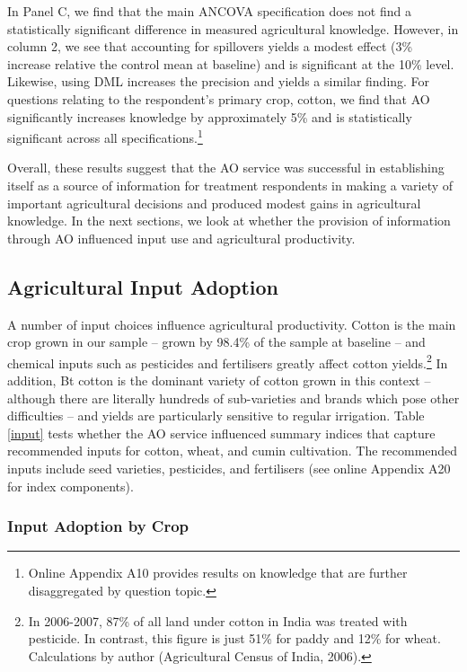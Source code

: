 \documentclass[12pt]{article}
\begin{document}
{\normalsize In Panel C, we find that the main ANCOVA specification does not find a statistically significant difference in measured agricultural knowledge. However, in column 2, we see that accounting for spillovers yields a modest effect (3\% increase relative the control mean at baseline) and is significant at the 10\% level. Likewise, using DML increases the precision and yields a similar finding. For questions relating to the respondent's primary crop, cotton, we find that AO significantly increases knowledge by approximately 5\% and is statistically significant across all specifications.\footnote{Online Appendix A10 provides results on knowledge that are further disaggregated by question topic.}

{\normalsize Overall, these results suggest that the AO service was successful in establishing itself as a source of information for treatment respondents in making a variety of important agricultural decisions and produced modest gains in agricultural knowledge. In the next sections, we look at whether the provision of information through AO influenced input use and agricultural productivity. }

\subsection{\protect\normalsize Agricultural Input Adoption}


{\normalsize A number of input choices influence agricultural productivity.
Cotton is the main crop grown in our sample -- grown by 98.4\% of the
sample at baseline -- and chemical inputs such as pesticides and fertilisers
greatly affect cotton yields.\footnote{%
In 2006-2007, 87\% of all land under cotton in India was treated with
pesticide. In contrast, this figure is just 51\% for paddy and 12\% for
wheat. Calculations by author (Agricultural Census of India, 2006).} In
addition, Bt cotton is the dominant variety of cotton grown in this context
-- although there are literally hundreds of sub-varieties and brands which
pose other difficulties -- and yields are particularly sensitive to regular
irrigation.} Table \ref{input} tests whether the AO service influenced summary indices that capture recommended inputs for cotton, wheat, and cumin cultivation.  The recommended inputs include seed varieties, pesticides, and fertilisers (see online Appendix A20 for index components). 


\subsubsection{\protect\normalsize Input Adoption by Crop}

}
\end{document}
